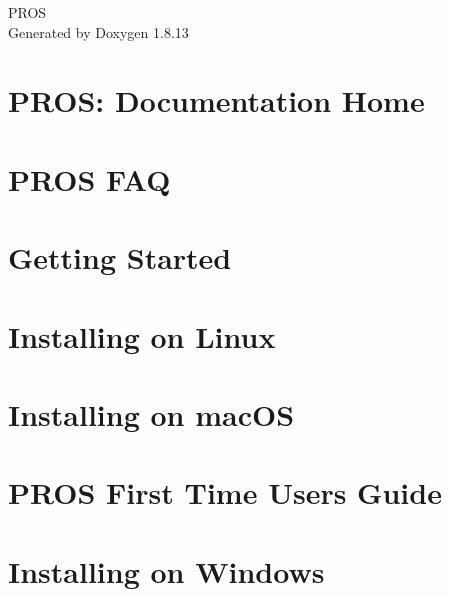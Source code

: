 \documentclass[twoside]{book}
\newcommand{\+}{\discretionary{\mbox{\scriptsize$\hookleftarrow$}}{}{}}
\newcommand{\clearemptydoublepage}{%
  \newpage{\pagestyle{empty}\cleardoublepage}%
}
\begin{document}
\hypersetup{pageanchor=false,
             bookmarksnumbered=true,
             pdfencoding=unicode
            }
\begin{titlepage}
\vspace*{7cm}
\begin{center}%
{\Large P\+R\+OS }\\
\vspace*{1cm}
{\large Generated by Doxygen 1.8.13}\\
\end{center}
\end{titlepage}
\clearemptydoublepage
{}
\tableofcontents
\clearemptydoublepage
{}
\hypersetup{pageanchor=true}

\chapter{P\+R\+OS\+: Documentation Home}
\label{index}\hypertarget{index}{}
\chapter{P\+R\+OS F\+AQ}
\label{md_docs_getting-started_faq}

\chapter{Getting Started}
\label{autotoc_md1}

\chapter{Installing on Linux}
\label{md_docs_getting-started_linux}

\chapter{Installing on mac\+OS}
\label{md_docs_getting-started_macos}

\chapter{P\+R\+OS First Time Users Guide}
\label{md_docs_getting-started_new-users}

\chapter{Installing on Windows}
\label{md_docs_getting-started_windows}

\end{document}
